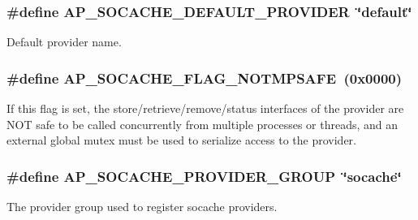 \subsubsection[{\texorpdfstring{A\+P\+\_\+\+S\+O\+C\+A\+C\+H\+E\+\_\+\+D\+E\+F\+A\+U\+L\+T\+\_\+\+P\+R\+O\+V\+I\+D\+ER}{AP_SOCACHE_DEFAULT_PROVIDER}}]{\setlength{\rightskip}{0pt plus 5cm}\#define A\+P\+\_\+\+S\+O\+C\+A\+C\+H\+E\+\_\+\+D\+E\+F\+A\+U\+L\+T\+\_\+\+P\+R\+O\+V\+I\+D\+ER~\char`\"{}default\char`\"{}}\hypertarget{group__AP__SOCACHE_ga12c4c3d0a2402bd99628671a29fb33ae}{}\label{group__AP__SOCACHE_ga12c4c3d0a2402bd99628671a29fb33ae}
Default provider name. 
\subsubsection[{\texorpdfstring{A\+P\+\_\+\+S\+O\+C\+A\+C\+H\+E\+\_\+\+F\+L\+A\+G\+\_\+\+N\+O\+T\+M\+P\+S\+A\+FE}{AP_SOCACHE_FLAG_NOTMPSAFE}}]{\setlength{\rightskip}{0pt plus 5cm}\#define A\+P\+\_\+\+S\+O\+C\+A\+C\+H\+E\+\_\+\+F\+L\+A\+G\+\_\+\+N\+O\+T\+M\+P\+S\+A\+FE~(0x0000)}\hypertarget{group__AP__SOCACHE_ga770558b0e3bdd232891e4bdbd6a04534}{}\label{group__AP__SOCACHE_ga770558b0e3bdd232891e4bdbd6a04534}
If this flag is set, the store/retrieve/remove/status interfaces of the provider are N\+OT safe to be called concurrently from multiple processes or threads, and an external global mutex must be used to serialize access to the provider. 
\subsubsection[{\texorpdfstring{A\+P\+\_\+\+S\+O\+C\+A\+C\+H\+E\+\_\+\+P\+R\+O\+V\+I\+D\+E\+R\+\_\+\+G\+R\+O\+UP}{AP_SOCACHE_PROVIDER_GROUP}}]{\setlength{\rightskip}{0pt plus 5cm}\#define A\+P\+\_\+\+S\+O\+C\+A\+C\+H\+E\+\_\+\+P\+R\+O\+V\+I\+D\+E\+R\+\_\+\+G\+R\+O\+UP~\char`\"{}socache\char`\"{}}\hypertarget{group__AP__SOCACHE_ga4a0deb72eb377ff31cf33b692dc4375b}{}\label{group__AP__SOCACHE_ga4a0deb72eb377ff31cf33b692dc4375b}
The provider group used to register socache providers. 
